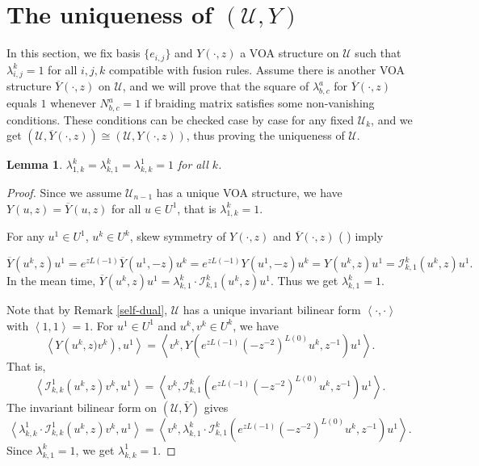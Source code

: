 \documentclass{article}
\newtheorem{lemma}{Lemma}[section]
\begin{document}
\section{The uniqueness of $(\mathcal{U},Y)$}
In this section, we fix basis $\{e_{i,j}\}$ and 
$Y(\cdot,z)$ a VOA structure on $\mathcal{U}$ such that $\lambda_{i,j}^k=1$
for all $i,j,k$ compatible with fusion rules.
Assume there is another VOA structure $\overline{Y}(\cdot,z)$ on $\mathcal{U}$,
and we will prove that the square of $\lambda_{b,c}^a$ for $\overline{Y}(\cdot,z)$
equals $1$ whenever $N_{b,c}^a=1$
if braiding matrix satisfies some non-vanishing conditions.
These conditions can be checked case by case for any fixed $\mathcal{U}_k$,
and we get $(\mathcal{U},\overline{Y}(\cdot,z))\cong (\mathcal{U},Y(\cdot,z))$,
thus proving the uniqueness of $\mathcal{U}$.

\begin{lemma}
$\lambda_{1,k}^k=\lambda_{k,1}^k=\lambda_{k,k}^1=1$ for all $k$.
\end{lemma}
\begin{proof}    
Since we assume $\mathcal{U}_{n-1}$ has a unique VOA structure,
we have $Y(u,z)=\overline{Y}(u,z)$ for all $u\in U^1$, that is $\lambda_{1,k}^k=1$.    

For any $u^{1}\in U^{1}$, $u^{k}\in U^{k}$, skew symmetry of $Y\left(\cdot,z\right)$
and $\overline{Y}\left(\cdot,z\right)$ ( \cite{FHL} ) imply

$$
\overline{Y}(u^{k},z)u^{1}=e^{zL\left(-1\right)}\overline{Y}\left(u^{1},-z\right)u^{k}=e^{zL\left(-1\right)}Y(u^{1},-z)u^{k}=Y\left(u^{k},z\right)u^{1}=\mathcal{I}_{k,1}^{k}\left(u^{k},z\right)u^{1}.
$$
In the mean time, $\overline{Y}\left(u^{k},z\right)u^{1}=\lambda_{k,1}^{k}\cdot\mathcal{I}_{k,1}^{k}(u^{k},z)u^{1}$.
Thus we get $\lambda_{k,1}^{k}=1$.

Note that by Remark \ref{self-dual}, $\mathcal{U}$ has a unique
invariant bilinear form $\left\langle \cdot,\cdot\right\rangle $
with $\left\langle 1,1\right\rangle =1$. For $u^{1}\in U^{1}$ and
$u^{k},v^{k}\in U^{k}$, we have
$$
\left\langle Y\left(u^{k},z)v^{k}\right),u^{1}\right\rangle =\left\langle v^{k},Y\left(e^{zL\left(-1\right)}\left(-z^{-2}\right)^{L\left(0\right)}u^{k},z^{-1}\right)u^{1}\right\rangle .
$$
That is,
$$
\left\langle \mathcal{I}_{k,k}^{1}\left(u^{k},z\right)v^{k},u^{1}\right\rangle 
=\left\langle v^{k},\mathcal{I}_{k,1}^{k}\left(e^{zL\left(-1\right)}\left(-z^{-2}\right)^{L\left(0\right)}u^{k},z^{-1}\right)u^{1}\right\rangle .
$$
The invariant bilinear form on $\left(\mathcal{U},\overline{Y}\right)$
gives
$$
\left\langle \lambda_{k,k}^{1}\cdot\mathcal{I}_{k,k}^{1}\left(u^{k},z\right)v^{k},u^{1}\right\rangle 
=\left\langle v^{k},\lambda_{k,1}^{k}\cdot\mathcal{I}_{k,1}^{k}\left(e^{zL\left(-1\right)}\left(-z^{-2}\right)^{L\left(0\right)}u^{k},z^{-1}\right)u^{1}\right\rangle .
$$
Since $\lambda_{k,1}^k=1$, we get $\lambda_{k,k}^{1}=1$.
\end{proof}
\end{document}
